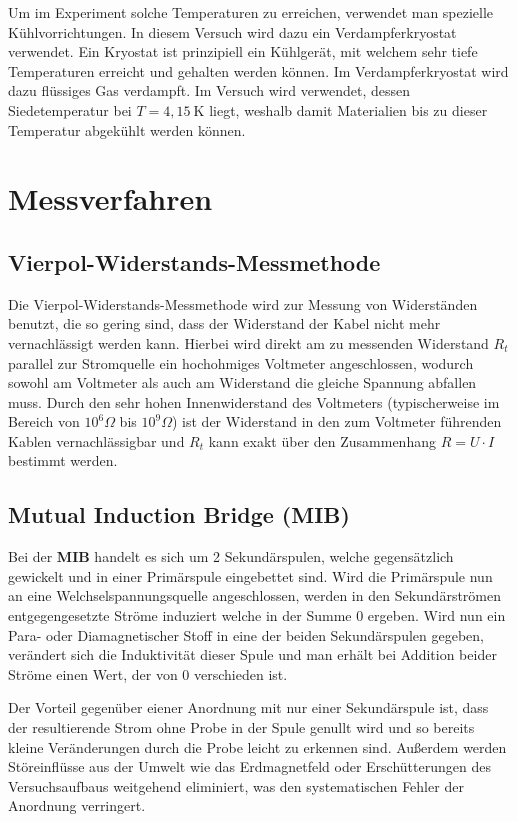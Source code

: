 \documentclass[bigchapter,colorback,accentcolor=tud4b,linedtoc,11pt]{tudreport}
\numberwithin{equation}{subsection}
\begin{document}
Um im Experiment solche Temperaturen zu erreichen, verwendet man spezielle Kühlvorrichtungen. In diesem Versuch wird dazu ein Verdampferkryostat verwendet. Ein Kryostat ist prinzipiell ein Kühlgerät, mit welchem sehr tiefe Temperaturen erreicht und gehalten werden können. Im Verdampferkryostat wird dazu flüssiges Gas verdampft. Im Versuch wird  verwendet, dessen Siedetemperatur bei \(T = 4,15 \ \mathrm{K}\) liegt, weshalb damit Materialien bis zu dieser Temperatur abgekühlt werden können.

\section{Messverfahren}
\subsection{Vierpol-Widerstands-Messmethode}
Die Vierpol-Widerstands-Messmethode wird zur Messung von Widerständen benutzt, die so gering sind, dass der Widerstand der Kabel nicht mehr vernachlässigt werden kann. Hierbei wird direkt am zu messenden Widerstand $R_t$ parallel zur Stromquelle ein hochohmiges Voltmeter angeschlossen, wodurch sowohl am Voltmeter als auch am Widerstand die gleiche Spannung abfallen muss. Durch den sehr hohen Innenwiderstand des Voltmeters (typischerweise im Bereich von $10^6\Omega$ bis $10^9\Omega$) ist der Widerstand in den zum Voltmeter führenden Kablen vernachlässigbar und $R_t$ kann exakt über den Zusammenhang $R=U \cdot I$ bestimmt werden.
\subsection{Mutual Induction Bridge (\textbf{MIB})}
Bei der \textbf{MIB} handelt es sich um 2 Sekundärspulen, welche gegensätzlich gewickelt und in einer Primärspule eingebettet sind. Wird die Primärspule nun an eine Welchselspannungsquelle angeschlossen, werden in den Sekundärströmen entgegengesetzte Ströme induziert welche in der Summe 0 ergeben. Wird nun ein Para- oder Diamagnetischer Stoff in eine der beiden Sekundärspulen gegeben, verändert sich die Induktivität dieser Spule und man erhält bei Addition beider Ströme einen Wert, der von 0 verschieden ist.

Der Vorteil gegenüber eiener Anordnung mit nur einer Sekundärspule ist, dass der resultierende Strom ohne Probe in der Spule genullt wird und so bereits kleine Veränderungen durch die Probe leicht zu erkennen sind. Außerdem werden Störeinflüsse aus der Umwelt wie das Erdmagnetfeld oder Erschütterungen des Versuchsaufbaus weitgehend eliminiert, was den systematischen Fehler der Anordnung verringert.
\end{document}
